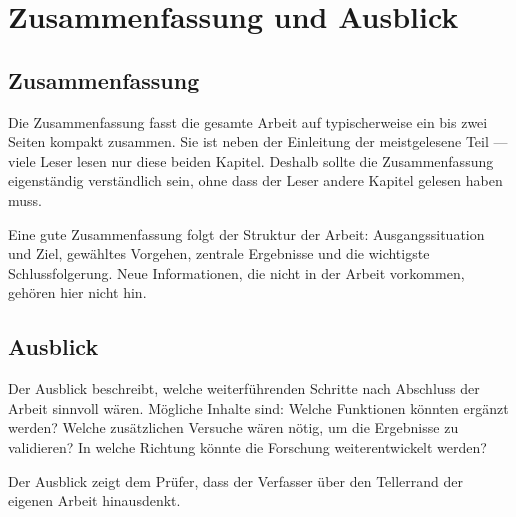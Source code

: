 \chapter{Zusammenfassung und Ausblick}

\section{Zusammenfassung}

Die Zusammenfassung fasst die gesamte Arbeit auf typischerweise ein bis zwei Seiten kompakt zusammen. Sie ist neben der Einleitung der meistgelesene Teil — viele Leser lesen nur diese beiden Kapitel. Deshalb sollte die Zusammenfassung eigenständig verständlich sein, ohne dass der Leser andere Kapitel gelesen haben muss.

Eine gute Zusammenfassung folgt der Struktur der Arbeit: Ausgangssituation und Ziel, gewähltes Vorgehen, zentrale Ergebnisse und die wichtigste Schlussfolgerung. Neue Informationen, die nicht in der Arbeit vorkommen, gehören hier nicht hin.

\section{Ausblick}

Der Ausblick beschreibt, welche weiterführenden Schritte nach Abschluss der Arbeit sinnvoll wären. Mögliche Inhalte sind: Welche Funktionen könnten ergänzt werden? Welche zusätzlichen Versuche wären nötig, um die Ergebnisse zu validieren? In welche Richtung könnte die Forschung weiterentwickelt werden?

Der Ausblick zeigt dem Prüfer, dass der Verfasser über den Tellerrand der eigenen Arbeit hinausdenkt.